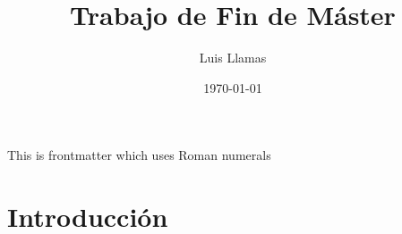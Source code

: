 \documentclass[12pt, a4paper]{book}
\title{Trabajo de Fin de Máster}
\author{Luis Llamas}
\date{\today}
\begin{document}

\frontmatter
\maketitle
This is frontmatter which uses Roman numerals

\mainmatter
\chapter{Introducción}
\lipsum[1-5]
\end{document}
